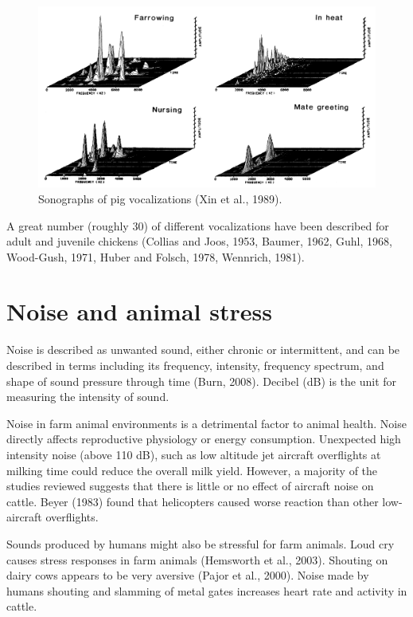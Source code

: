 \documentclass[]{book}
\begin{document}
\begin{figure}

{\centering \includegraphics[width=1\linewidth]{figures/pig-vocal2} 

}

\caption{Sonographs of pig vocalizations (Xin et al., 1989).}\label{fig:pig-vocalization}
\end{figure}

A great number (roughly 30) of different vocalizations have been described for adult and juvenile chickens (Collias and Joos, 1953, Baumer, 1962, Guhl, 1968, Wood-Gush, 1971, Huber and Folsch, 1978, Wennrich, 1981).

\hypertarget{noise-and-animal-stress}{%
\section{Noise and animal stress}\label{noise-and-animal-stress}}

Noise is described as unwanted sound, either chronic or intermittent, and can be described in terms including its frequency, intensity, frequency spectrum, and shape of sound pressure through time (Burn, 2008). Decibel (dB) is the unit for measuring the intensity of sound.

Noise in farm animal environments is a detrimental factor to animal
health. Noise directly affects reproductive physiology or energy consumption. Unexpected high intensity noise (above 110 dB), such as low altitude jet aircraft overflights at milking time could reduce the overall milk yield. However, a majority of the studies reviewed suggests that there is little or no effect of aircraft noise on cattle. Beyer (1983) found that helicopters caused worse reaction than other low-aircraft overflights.

Sounds produced by humans might also be stressful for farm animals. Loud cry causes stress responses in farm animals (Hemsworth et al., 2003). Shouting on dairy cows appears to be very aversive (Pajor et al., 2000). Noise made by humans shouting and slamming of metal gates increases heart rate and activity in cattle.
\end{document}
